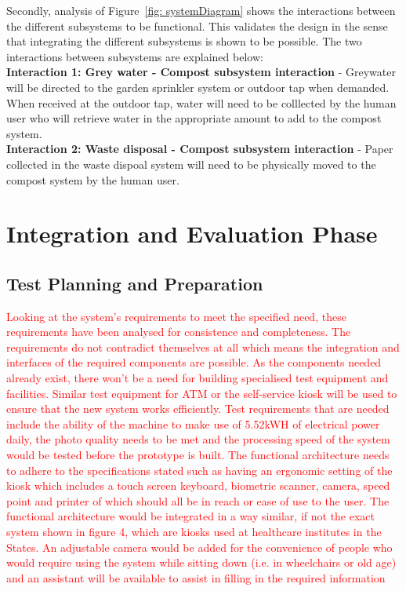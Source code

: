 \documentclass[a4paper,11pt,fleqn]{report}
\begin{document}
{Secondly, analysis of Figure~\ref{fig: systemDiagram} shows the interactions between the different subsystems to be functional. This validates the design in the sense that integrating the different subsystems is shown to be possible. The two interactions between subsystems are explained below:\\

\textbf{Interaction 1: Grey water - Compost subsystem interaction} - Greywater will be directed to the garden sprinkler system or outdoor tap when demanded. When received at the outdoor tap, water will need to be colllected by the human user who will retrieve water in the appropriate amount to add to the compost system.\\

\textbf{Interaction 2: Waste disposal - Compost subsystem interaction} - Paper collected in the waste dispoal system will need to be physically moved to the compost system by the human user.

\section{Integration and Evaluation Phase}

\subsection{Test Planning and Preparation}
\textcolor{red}{Looking at the system’s requirements to meet the specified need, these requirements have been analysed for consistence and completeness. The requirements do not contradict themselves at all which means the integration and interfaces of the required components are possible. As the components needed already exist, there won’t be a need for building specialised test equipment and facilities. Similar test equipment for ATM or the self-service kiosk will be used to ensure that the new system works efficiently. Test requirements that are needed include the ability of the machine to make use of 5.52kWH of electrical power daily, the photo quality needs to be met and the processing speed of the system would be tested before the prototype is built. The functional architecture needs to adhere to the specifications stated such as having an ergonomic setting of the kiosk which includes a touch screen keyboard, biometric scanner, camera, speed point and printer of which should all be in reach or ease of use to the user. The functional architecture would be integrated in a way similar, if not the exact system shown in figure 4, which are kiosks used at healthcare institutes in the States. An adjustable camera would be added for the convenience of people who would require using the system while sitting down (i.e. in wheelchairs or old age) and an assistant will be available to assist in filling in the required information}

}
\end{document}
